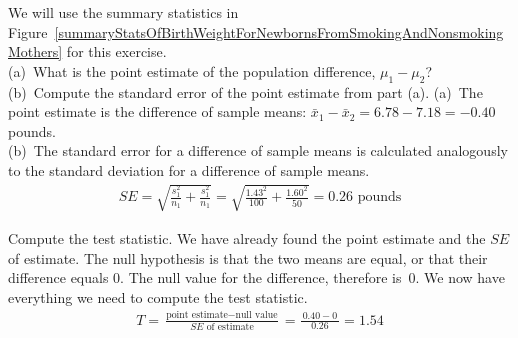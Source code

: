 \begin{examplewrap}
\begin{nexample}
{We will use the summary statistics in Figure~\ref{summaryStatsOfBirthWeightForNewbornsFromSmokingAndNonsmokingMothers} for this exercise.
\\ (a)~What is the point estimate of the population difference, $\mu_{1} - \mu_{2}$? 
\\(b)~Compute the standard error of the point estimate from part (a).}
(a)~The point estimate is the difference of sample means: $\bar{x}_{1} - \bar{x}_{2} = 6.78-7.18=-0.40$ pounds. \\
(b)~The standard error for a difference of sample means is calculated analogously to the standard deviation for a difference of sample means.
\begin{eqnarray*}
SE = \sqrt{\frac{s_1^2}{n_1} + \frac{s_1^2}{n_1}}
	= \sqrt{\frac{1.43^2}{100} + \frac{1.60^2}{50}}
	= 0.26 \text{ pounds}
\end{eqnarray*}
\end{nexample}
\end{examplewrap}


\begin{examplewrap}
\begin{nexample}{Compute the test statistic. } \label{babySmokeHTForWeightComputePValueAndEvalHT}
We have already found the point estimate and the $SE$ of estimate.  The null hypothesis is that the two means are equal, or that their difference equals 0.  The null value for the difference, therefore is~0.  We now have everything we need to compute the test statistic.
\begin{eqnarray*}
T = \frac{\text{point estimate} - \text{null value}}{SE \text{ of estimate}} = \frac{\ 0.40 - 0\ }{0.26} = 1.54
\end{eqnarray*}
\end{nexample}
\end{examplewrap}


